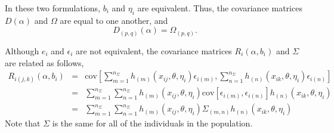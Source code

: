 \documentclass{article}
\begin{document}
In these two formulations, $b_i$ and $\eta_i$ are
equivalent.
Thus, the covariance matrices $D(\alpha)$ and 
$\Omega$ are equal to one another, and
  \begin{equation}
    D_{(p,q)}(\alpha) = \Omega_{(p,q)} .
  \end{equation}

Although $e_i$ and $\epsilon_i$ are not equivalent, 
the covariance matrices $R_i(\alpha, b_i)$ and 
$\Sigma$ are related as follows,
  \begin{eqnarray*}
    R_{i(j,k)}(\alpha, b_i) & = &  \mbox{cov} \left[
      \sum_{m=1}^{n_{\Sigma}} h_{(m)}(x_{ij}, \theta, \eta_i) \epsilon_{i(m)},
      \sum_{n=1}^{n_{\Sigma}} h_{(n)}(x_{ik}, \theta, \eta_i) \epsilon_{i(n)} \right] \\
    & = & \sum_{m=1}^{n_{\Sigma}} \sum_{n=1}^{n_{\Sigma}} 
      h_{(m)}(x_{ij}, \theta, \eta_i) 
      \mbox{cov} [ \epsilon_{i(m)} , \epsilon_{i(n)} ]
      h_{(n)}(x_{ik}, \theta, \eta_i)  \\
    & = & \sum_{m=1}^{n_{\Sigma}} \sum_{n=1}^{n_{\Sigma}} 
      h_{(m)}(x_{ij}, \theta, \eta_i) 
      \Sigma_{(m,n)}
      h_{(n)}(x_{ik}, \theta, \eta_i)
  \end{eqnarray*}
Note that $\Sigma$ is the same for all of the individuals in
the population.


%
%
\end{document}
